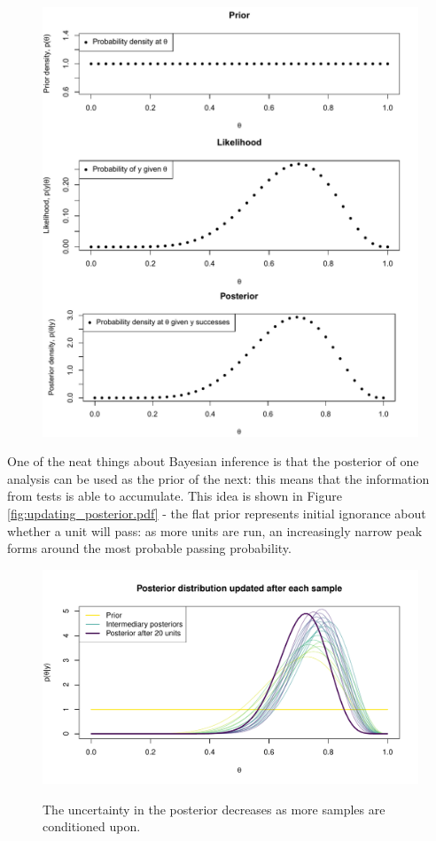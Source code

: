 \documentclass[11pt,a4paper,article]{memoir} %
\begin{document}
\begin{figure}
\includegraphics[width=\textwidth]{Bayesian_inference.pdf}
\caption{}
\label{fig:binom_bayes_inference}
\end{figure}
\par
One of the neat things about Bayesian inference is that the posterior of one analysis can be used as the prior of the next: this means that the information from tests is able to accumulate. This idea is shown in Figure \ref{fig:updating_posterior.pdf} - the flat prior represents initial ignorance about whether a unit will pass: as more units are run, an increasingly narrow peak forms around the most probable passing probability.
\begin{figure}
\includegraphics[width=\textwidth]{updating_posterior.pdf}
\label{fig:updating_posterior}
\caption{The uncertainty in the posterior decreases as more samples are conditioned upon.}
\end{figure}
\end{document}
